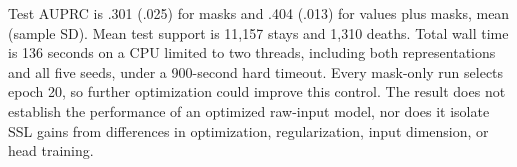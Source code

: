 Test AUPRC is .301 (.025) for masks and .404 (.013) for values plus masks, mean (sample SD). Mean test support is 11,157 stays and 1,310 deaths. Total wall time is 136 seconds on a CPU limited to two threads, including both representations and all five seeds, under a 900-second hard timeout. Every mask-only run selects epoch 20, so further optimization could improve this control. The result does not establish the performance of an optimized raw-input model, nor does it isolate SSL gains from differences in optimization, regularization, input dimension, or head training.
